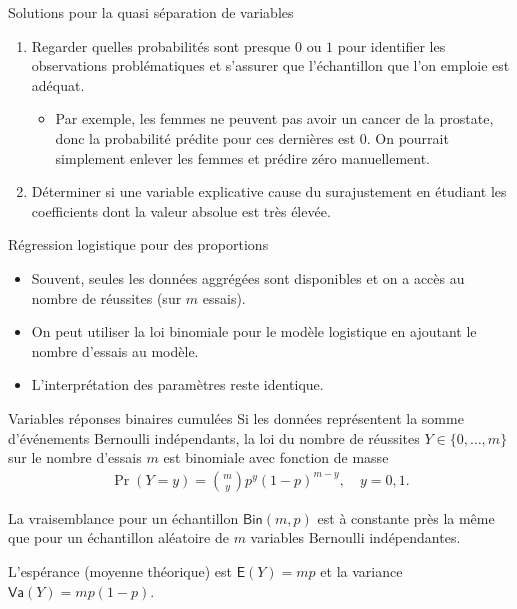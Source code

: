 \documentclass[
  ignorenonframetext,
]{beamer}
\providecommand{\tightlist}{%
  \setlength{\itemsep}{0pt}\setlength{\parskip}{0pt}}
\begin{document}
\begin{frame}{Solutions pour la quasi séparation de variables}
\protect{}\label{solutions-pour-la-quasi-suxe9paration-de-variables}
\begin{enumerate}
\tightlist
\item
  Regarder quelles probabilités sont presque \(0\) ou \(1\) pour
  identifier les observations problématiques et s'assurer que
  l'échantillon que l'on emploie est adéquat.

  \begin{itemize}
  \tightlist
  \item
    Par exemple, les femmes ne peuvent pas avoir un cancer de la
    prostate, donc la probabilité prédite pour ces dernières est \(0\).
    On pourrait simplement enlever les femmes et prédire zéro
    manuellement.
  \end{itemize}
\item
  Déterminer si une variable explicative cause du surajustement en
  étudiant les coefficients dont la valeur absolue est très élevée.
\end{enumerate}
\end{frame}

\begin{frame}{Régression logistique pour des proportions}
\protect{}\label{ruxe9gression-logistique-pour-des-proportions}
\begin{itemize}
\tightlist
\item
  Souvent, seules les données aggrégées sont disponibles et on a accès
  au nombre de réussites (sur \(m\) essais).
\item
  On peut utiliser la loi binomiale pour le modèle logistique en
  ajoutant le nombre d'essais au modèle.
\item
  L'interprétation des paramètres reste identique.
\end{itemize}
\end{frame}

\begin{frame}{Variables réponses binaires cumulées}
\protect{}\label{variables-ruxe9ponses-binaires-cumuluxe9es}
Si les données représentent la somme d'événements Bernoulli
indépendants, la loi du nombre de réussites \(Y \in \{0, \ldots, m\}\)
sur le nombre d'essais \(m\) est binomiale avec fonction de masse
\begin{align*}
\Pr(Y=y) = \binom{m}{y}p^y (1-p)^{m-y}, \quad y=0, 1.
\end{align*}

La vraisemblance pour un échantillon \(\mathsf{Bin}(m, p)\) est à
constante près la même que pour un échantillon aléatoire de \(m\)
variables Bernoulli indépendantes.

L'espérance (moyenne théorique) est \(\mathsf{E}(Y)=mp\) et la variance
\(\mathsf{Va}(Y)=mp(1-p)\).
\end{frame}
\end{document}
